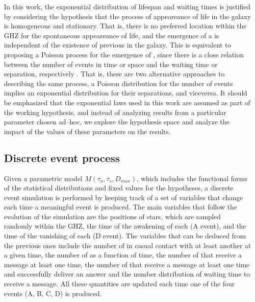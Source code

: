 In this work, the exponential distribution of lifespan and waiting
times is justified by considering the hypothesis that the process of
appeareance of life in the galaxy is homogeneous and stationary.
%
That is, there is no preferred location within the GHZ for the
spontaneous appeareance of life, and the emergence of a \ceti is
independent of the existence of previous \cetis in the galaxy.
%            
This is equivalent to proposing a Poisson process for the emergence of
\cetis, since there is a close relation between the number of events
in time or space and the waiting time or separation, respectively
\citep[e.g., ][]{ross_simulation_2012}.
%
That is, these are two alternative approaches to describing the same
process, a Poisson distribution for the number of events implies an
exponential distribution for their separations, and viceversa.
%
It should be emphasized that the exponential laws used in this work
are assumed as part of the working hypothesis, and instead of
analyzing results from a particular parameter chosen ad--hoc, we
explore the hypothesis space and analyze the impact of the values of
these parameters on the results.
                                                           



\subsection{Discrete event process}

Given a parametric model $M(\tau_a, \tau_s, D_{max})$, which includes
the functional forms of the statistical distributions and fixed values
for the hypotheses, a discrete event simulation is performed by
keeping track of a set of variables that change each time a meaningful
event is produced.
%
The main variables that follow the evolution of the simulation are the
positions of stars, which are sampled randomly within the GHZ, the
time of the awakening of each \ceti (A event), and the time of the
vanishing of each \ceti (D event).
%
The variables that can be deduced from the previous ones include the
number of \cetis in casual contact with at least another \ceti at a given
time, the number of \cetis as a function of time, the number of \cetis
that receive a message at least one time, the number of \cetis that
receive a message at least one time and successfully deliver an answer
and the number distribution of waiting time to receive a message.
%
All these quantities are updated each time one of the four events (A,
B, C, D) is produced.
          
